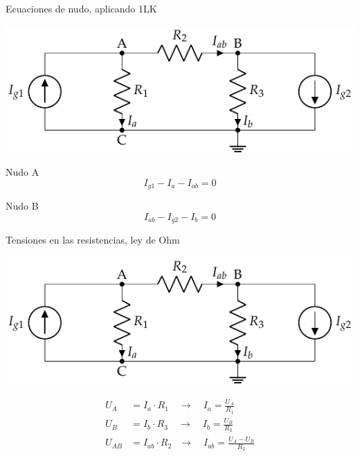 \documentclass[aspectratio=169, xcolor={usenames,svgnames,dvipsnames}]{beamer}
\begin{document}
\begin{frame}{Ecuaciones de nudo, aplicando 1LK}
    \begin{center}
    \includegraphics[width=.8\linewidth]{../figs/nudos.pdf}
    \end{center}
    
    Nudo A
    \begin{equation*}
      I_{g1} - I_a - I_{ab} = 0
    \end{equation*}
    
    Nudo B
    \begin{equation*}
      I_{ab} - I_{g2} - I_b = 0
    \end{equation*}
\end{frame}
    

\begin{frame}{Tensiones en las resistencias, ley de Ohm}
    \begin{center}
    \includegraphics[width=.7\linewidth]{../figs/nudos.pdf}
    \end{center}
    \begin{align*}
      U_A &= I_a \cdot R_1 \quad \rightarrow \quad I_a = \frac{U_A}{R_1}\\
      U_B &= I_b \cdot R_3 \quad \rightarrow \quad I_b = \frac{U_B}{R_3}\\
      U_{AB} &= I_{ab} \cdot R_2  \;\;\, \rightarrow \quad I_{ab} = \frac{U_A-U_B}{R_2}
    \end{align*}
\end{frame}

\end{document}
